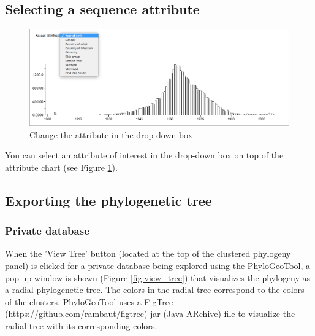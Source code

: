 \documentclass[a4paper, 11pt]{article} %
\begin{document}
\subsection{Selecting a sequence attribute}
\begin{figure}[H]
\centering
\includegraphics[scale=0.38]{images/change_attr.PNG}
\vspace{-0.75cm}
\caption{Change the attribute in the drop down box}
\label{fig:change_attr}
\end{figure}
You can select an attribute of interest in the drop-down box on top of the attribute chart (see Figure \ref{fig:change_attr}).


\subsection{Exporting the phylogenetic tree}

\subsubsection{Private database}
\label{sec:private}

When the 'View Tree' button (located at the top of the clustered phylogeny panel) is clicked for a private database being explored using the PhyloGeoTool, a pop-up window is shown (Figure \ref{fig:view_tree}) that visualizes the phylogeny as a radial phylogenetic tree. 
The colors in the radial tree correspond to the colors of the clusters.
PhyloGeoTool uses a FigTree (\url{https://github.com/rambaut/figtree}) jar (Java ARchive) file to visualize the radial tree with its corresponding colors.
\end{document}
